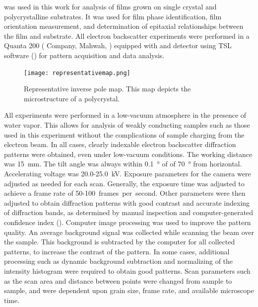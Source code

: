  was used in this work for analysis of  films grown on single crystal
and polycrystalline substrates. It was used for film phase identification, film
orientation measurement, and determination of epitaxial relationships between the film and
substrate. All electron backscatter experiments were performed in a Quanta 200
 ( Company, Mahwah, ) equipped with and 
detector using TSL software () for pattern acquisition and data analysis.
\begin{figure}
\begin{center}
\texttt{[image: representativemap.png]}
\caption[Representative  inverse pole map]{%
	Representative  inverse pole map. This map depicts the 
	microstructure of a  polycrystal.}
\label{fig:representativemap}
\end{center}
\end{figure}
All experiments were performed in a low-vacuum atmosphere in the presence of water vapor.
This allows for analysis of weakly conducting samples such as those used in this
experiment without the complications of sample charging from the electron beam. In all
cases, clearly indexable electron backscatter diffraction patterns were obtained, even
under low-vacuum conditions. The working distance was \SI{15}{\milli\meter}. The tilt
angle was always within \SI{0.1}{\degree} of of \SI{70}{\degree} from horizontal.
Accelerating voltage was 20.0-25.0~\si{\kilo\volt}. Exposure parameters for the 
camera were adjusted as needed for each scan. Generally, the exposure time was adjusted to
achieve a frame rate of 50-100~frames~per~second. Other parameters were then adjusted to
obtain diffraction patterns with good contrast and accurate indexing of diffraction bands,
as determined by manual inspection and computer-generated confidence index (). 
Computer image processing was used to improve the pattern quality. An average background
signal was collected while scanning the beam over the sample. This background is
subtracted by the computer for all collected patterns, to increase the contrast of the
pattern. In some cases, additional processing such as dynamic background subtraction and
normalizing of the intensity histogram were required to obtain good patterns. Scan
parameters such as the scan area and distance between points were changed from sample to
sample, and were dependent upon grain size, frame rate, and available microscope time.


